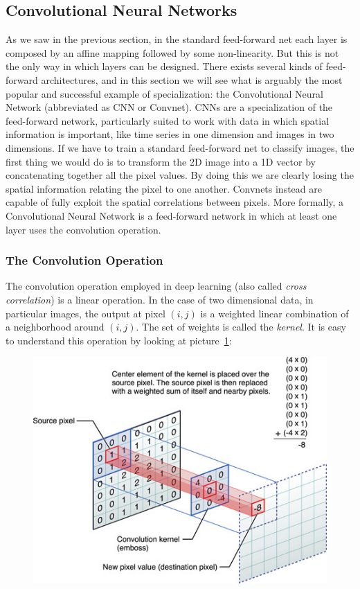 \documentclass[../main.tex]{subfiles}
\begin{document}
    \subsection{Convolutional Neural Networks}\label{subsec:convnets}
    As we saw in the previous section, in the standard feed-forward net each layer is composed by an affine mapping followed by some non-linearity.
    But this is not the only way in which layers can be designed. There exists several kinds of feed-forward architectures, and in this section
    we will see what is arguably the most popular and successful example of specialization: the Convolutional
    Neural Network (abbreviated as CNN or Convnet).
    \newline
    CNNs are a specialization of the feed-forward network, particularly suited to work with data in which spatial information is important, like
    time series in one dimension and images in two dimensions. If we have to train a standard feed-forward net to classify images, the first
    thing we would do is to transform the 2D image into a 1D vector by concatenating together all the pixel values. By doing this we are
    clearly losing the spatial information relating the pixel to one another. Convnets instead are capable of fully exploit the spatial
    correlations between pixels.
    \newline
    More formally, a Convolutional Neural Network is a feed-forward network in which at least one layer uses the convolution operation.

    \subsubsection{The Convolution Operation}
    The convolution operation employed in deep learning (also called \textit{cross correlation}) is a linear operation.
    In the case of two dimensional data, in particular images, the output at pixel $(i, j)$ is a weighted linear combination
    of a neighborhood around $(i, j)$. The set of weights is called the \textit{kernel}. It is easy to understand this operation
    by looking at picture~\ref{fig:convolution-op}:

    \begin{figure}[h!]
        \centering
    	\includegraphics[width=.8\linewidth]{img/convolution-op.png}
        \label{fig:convolution-op}
	\end{figure}
\end{document}
